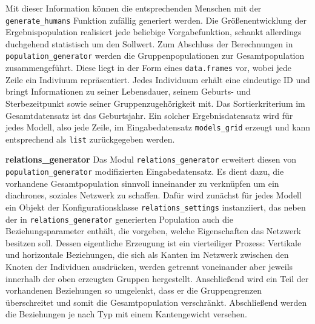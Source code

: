 \documentclass[openany,twoside,twocolumn]{book}
\begin{document}
Mit dieser Information können die entsprechenden Menschen mit der
\texttt{generate\_humans} Funktion zufällig generiert werden. Die
Größenentwicklung der Ergebnispopulation realisiert jede beliebige
Vorgabefunktion, schankt allerdings duchgehend statistisch um den
Sollwert. Zum Abschluss der Berechnungen in
\texttt{population\_generator} werden die Gruppenpopulationen zur
Gesamtpopulation zusammengeführt. Diese liegt in der Form eines
\texttt{data.frames} vor, wobei jede Zeile ein Indiviuum repräsentiert.
Jedes Individuum erhält eine eindeutige ID und bringt Informationen zu
seiner Lebensdauer, seinem Geburts- und Sterbezeitpunkt sowie seiner
Gruppenzugehörigkeit mit. Das Sortierkriterium im Gesamtdatensatz ist
das Geburtsjahr. Ein solcher Ergebnisdatensatz wird für jedes Modell,
also jede Zeile, im Eingabedatensatz \texttt{models\_grid} erzeugt und
kann entsprechend als \texttt{list} zurückgegeben werden.

\textbf{relations\_generator} \newline  Das Modul
\texttt{relations\_generator} erweitert diesen von
\texttt{population\_generator} modifizierten Eingabedatensatz. Es dient
dazu, die vorhandene Gesamtpopulation sinnvoll inneinander zu verknüpfen
um ein diachrones, soziales Netzwerk zu schaffen. Dafür wird zunächst
für jedes Modell ein Objekt der Konfigurationsklasse
\texttt{relations\_settings} instanziiert, das neben der in
\texttt{relations\_generator} generierten Population auch die
Beziehungsparameter enthält, die vorgeben, welche Eigenschaften das
Netzwerk besitzen soll. Dessen eigentliche Erzeugung ist ein
vierteiliger Prozess: Vertikale und horizontale Beziehungen, die sich
als Kanten im Netzwerk zwischen den Knoten der Individuen ausdrücken,
werden getrennt voneinander aber jeweils innerhalb der oben erzeugten
Gruppen hergestellt. Anschließend wird ein Teil der vorhandenen
Beziehungen so umgelenkt, dass er die Gruppengrenzen überschreitet und
somit die Gesamtpopulation verschränkt. Abschließend werden die
Beziehungen je nach Typ mit einem Kantengewicht versehen.
\end{document}
